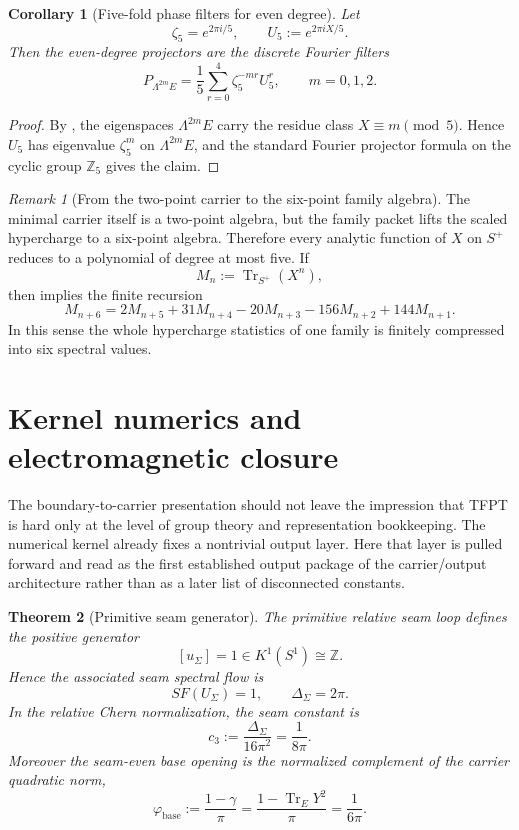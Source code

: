 \documentclass[11pt,a4paper]{article}
\newtheorem{theorem}{Theorem}[section]
\newtheorem{corollary}[theorem]{Corollary}
\theoremstyle{definition}
\theoremstyle{remark}
\newtheorem*{remark}{Remark}
\DeclareMathOperator{\tr}{Tr}
\newcommand{\Seam}{\Sigma}
\newcommand{\cthree}{c_3}
\newcommand{\phibase}{\varphi_{\mathrm{base}}}
\begin{document}
\begin{corollary}[Five-fold phase filters for even degree]
\label{cor:family-degree-filters}
Let
\[
\zeta_5=e^{2\pi i/5},
\qquad
U_5:=e^{2\pi iX/5}.
\]
Then the even-degree projectors are the discrete Fourier filters
\[
P_{\Lambda^{2m}E}
=
\frac15\sum_{r=0}^{4}\zeta_5^{-mr}U_5^r,
\qquad
m=0,1,2.
\]
\end{corollary}

\begin{proof}
By , the eigenspaces $\Lambda^{2m}E$ carry the residue class $X\equiv m\pmod 5$. Hence $U_5$ has eigenvalue $\zeta_5^m$ on $\Lambda^{2m}E$, and the standard Fourier projector formula on the cyclic group $\mathbb Z_5$ gives the claim.
\end{proof}

\begin{remark}[From the two-point carrier to the six-point family algebra]
The minimal carrier itself is a two-point algebra, but the family packet lifts the scaled hypercharge to a six-point algebra. Therefore every analytic function of $X$ on $S^+$ reduces to a polynomial of degree at most five. If
\[
M_n:=\tr_{S^+}(X^n),
\]
then  implies the finite recursion
\[
M_{n+6}
=
2M_{n+5}+31M_{n+4}-20M_{n+3}-156M_{n+2}+144M_{n+1}.
\]
In this sense the whole hypercharge statistics of one family is finitely compressed into six spectral values.
\end{remark}

\section{Kernel numerics and electromagnetic closure}

The boundary-to-carrier presentation should not leave the impression that TFPT is hard only at the level of group theory and representation bookkeeping. The numerical kernel already fixes a nontrivial output layer. Here that layer is pulled forward and read as the first established output package of the carrier/output architecture rather than as a later list of disconnected constants.

\begin{theorem}[Primitive seam generator]
\label{thm:primitive-seam-generator}
The primitive relative seam loop defines the positive generator
\[
[u_\Sigma]=1\in K^1(S^1)\cong \mathbb Z.
\]
Hence the associated seam spectral flow is
\[
SF(U_\Seam)=1,
\qquad
\Delta_\Seam=2\pi.
\]
In the relative Chern normalization, the seam constant is
\[
\cthree:=\frac{\Delta_\Seam}{16\pi^2}=\frac{1}{8\pi}.
\]
Moreover the seam-even base opening is the normalized complement of the carrier quadratic norm,
\[
\phibase
:=
\frac{1-\gamma}{\pi}
=
\frac{1-\tr_EY^2}{\pi}
=
\frac{1}{6\pi}.
\]
\end{theorem}
\end{document}
